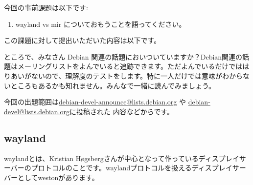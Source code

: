 \documentclass[mingoth,a4paper]{jsarticle}
\begin{document}

今回の事前課題は以下です:
\begin{enumerate}
 \item wayland vs mir についておもうことを語ってください。
\end{enumerate}
この課題に対して提出いただいた内容は以下です。
\begin{multicols}{2}
{\small
 
}
\end{multicols}


ところで、みなさん Debian 関連の話題においついていますか？Debian関連の話
題はメーリングリストをよんでいると追跡できます。ただよんでいるだけではは
りあいがないので、理解度のテストをします。特に一人だけでは意味がわからな
いところもあるかも知れません。みんなで一緒に読んでみましょう。

今回の出題範囲は\url{debian-devel-announce@lists.debian.org} や \url{debian-devel@lists.debian.org}に投稿された
内容などからです。

\begin{multicols}{2}
 
\end{multicols}






\subsection{wayland}
 waylandとは、Kristian H\o{}gsbergさんが中心となって作っているディスプレイサーバーのプロトコルのことです。waylandプロトコルを扱えるディスプレイサーバーとしてwestonがあります。 
\end{document}

